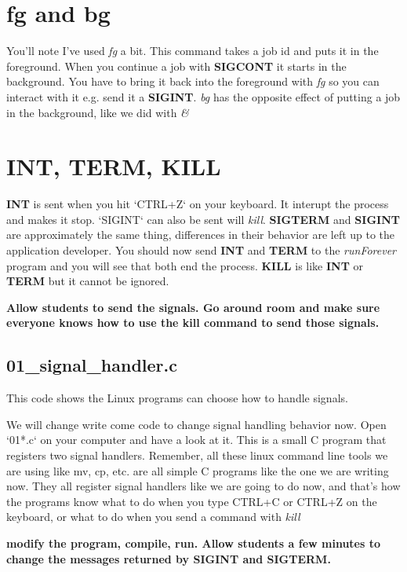 \documentclass[12pt]{article}
\begin{document}
\section{fg and bg}
You'll note I've used \textit{fg} a bit. This command takes a job id and puts it in the foreground. When you continue a job with \textbf{SIGCONT} it starts in the background. You have to bring it back into the foreground with \textit{fg} so you can interact with it e.g. send it a \textbf{SIGINT}. \textit{bg} has the opposite effect of putting a job in the background, like we did with \textit{\&}

\section{INT, TERM, KILL}
\textbf{INT} is sent when you hit `CTRL+Z` on your keyboard. It interupt the process and makes it stop. `SIGINT` can also be sent will \textit{kill}. \textbf{SIGTERM} and \textbf{SIGINT} are approximately the same thing, differences in their behavior are left up to the application developer. You should now send \textbf{INT} and \textbf{TERM} to the \textit{runForever} program and you will see that both end the process. \textbf{KILL} is like \textbf{INT} or \textbf{TERM} but it cannot be ignored.

\begin{center}
\textbf{Allow students to send the signals. Go around room and make sure everyone knows how to use the kill command to send those signals.}
\end{center}

\subsection{01\_signal\_handler.c}
This code shows the Linux programs can choose how to handle signals.

We will change write come code to change signal handling behavior now. Open `01*.c` on your computer and have a look at it. This is a small C program that registers two signal handlers. Remember, all these linux command line tools we are using like mv, cp, etc. are all simple C programs like the one we are writing now. They all register signal handlers like we are going to do now, and that's how the programs know what to do when you type CTRL+C or CTRL+Z on the keyboard, or what to do when you send a command with \textit{kill}

\begin{center}
\textbf{modify the program, compile, run. Allow students a few minutes to change the messages returned by SIGINT and SIGTERM. }
\end{center}
\end{document}
